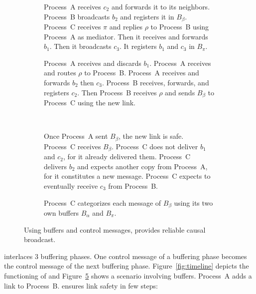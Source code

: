 \begin{figure}
\begin{center}
\begin{subfigure}[t]{0.48\textwidth}
      \centering%
      \caption{\label{fig:solveG}Process~A receives $c_2$ and forwards it to
        its neighbors.  Process~B broadcasts $b_2$ and registers it in
        $B_\beta$. Process~C receives $\pi$ and replies $\rho$ to Process~B
        using Process~A as mediator. Then it receives and forwards $b_1$. Then
        it broadcasts $c_3$. It registers $b_1$ and $c_3$ in $B_\pi$.}
    \end{subfigure}
    \begin{subfigure}[t]{0.48\textwidth}
      \centering%
      \caption{\label{fig:solveH}Process~A receives and discards $b_1$.
        Process~A receives and routes $\rho$ to Process~B.  Process~A receives
        and forwards $b_2$ then $c_3$. Process~B receives, forwards, and
        registers $c_2$. Then Process~B receives $\rho$ and sends $B_\beta$ to
        Process~C using the new link.}
    \end{subfigure}
    ~
    \begin{subfigure}[t]{0.48\textwidth}
      \centering%
      \caption{\label{fig:solveI}Once Process~A sent $B_\beta$, the new link is
        safe.  Process~C receives $B_\beta$. Process~C does not deliver $b_1$
        and $c_2$, for it already delivered them. Process~C delivers $b_2$ and
        expects another copy from Process~A, for it constitutes a new message.
        Process~C expects to eventually receive $c_3$ from Process~B.}
    \end{subfigure}
    \begin{subfigure}[t]{0.99\textwidth}
      \centering%
      \caption{\label{fig:solveJ}Process~C categorizes each message of
        $B_\beta$ using its two own buffers $B_\alpha$ and $B_\pi$.}
    \end{subfigure}
    \caption{\label{fig:solve}Using buffers and control messages, \RPCBROADCAST 
      provides reliable causal broadcast.}
  \end{center}
\end{figure}



\RPCBROADCAST interlaces 3 buffering phases. One control message of a buffering
phase becomes the control message of the next buffering
phase. Figure~\ref{fig:timeline} depicts the functioning of \RPCBROADCAST and
Figure~\ref{fig:solve} shows a scenario involving buffers.  Process~A adds a link to
Process~B. \RPCBROADCAST ensures link safety in few steps:


